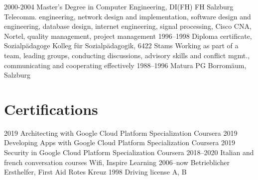 \documentclass[]{cv-style}          %
\begin{document}
\begin{entrylist}
\entry
  {2000-2004}
  {Master's Degree in Computer Engineering, DI(FH)}
  {FH Salzburg}
  {Telecomm. engineering, network design and implementation, software design and engineering, database design, internet engineering, signal processing, Cisco CNA, Nortel, quality management, project management}
\entry
{1996--1998}
{Diploma certificate, Sozialpädagoge}
{Kolleg für Sozialpädagogik, 6422 Stams}
{Working as part of a team, leading groups, conducting discussions, advisory skills and conflict mgmt., communicating and cooperating effectively}
\entry
{1988--1996}
{Matura}
{PG Borromäum, Salzburg}

\end{entrylist}


\section{Certifications}

\begin{entrylist}
\entry
{2019}
{Architecting with Google Cloud Platform Specialization}
{Coursera}
{\vspace{-0.3cm}}
\entry
{2019}
{Developing Apps with Google Cloud Platform Specialization}
{Coursera}
{\vspace{-0.3cm}}
\entry
{2019}
{Security in Google Cloud Platform Specialization}
{Coursera}
{\vspace{-0.3cm}}
\entry
{2018--2020}
{Italian and french conversation courses}
{Wifi, Inspire Learning}
{\vspace{-0.3cm}}
\entry
{2006--now}
{Betrieblicher Ersthelfer, First Aid}
{Rotes Kreuz}
{\vspace{-0.3cm}}
\entry
{1998}
{Driving license A, B}
{}
{\vspace{-0.3cm}}
\end{entrylist}

\end{document}
